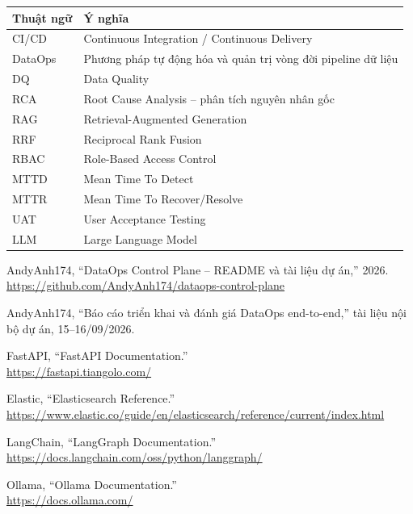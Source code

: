 \documentclass[12pt,a4paper,oneside]{report}
\begin{document}
\begin{longtable}{L{3.0cm} L{11.0cm}}
\toprule
\textbf{Thuật ngữ} & \textbf{Ý nghĩa} \\
\midrule
CI/CD & Continuous Integration / Continuous Delivery \\
DataOps & Phương pháp tự động hóa và quản trị vòng đời pipeline dữ liệu \\
DQ & Data Quality \\
RCA & Root Cause Analysis -- phân tích nguyên nhân gốc \\
RAG & Retrieval-Augmented Generation \\
RRF & Reciprocal Rank Fusion \\
RBAC & Role-Based Access Control \\
MTTD & Mean Time To Detect \\
MTTR & Mean Time To Recover/Resolve \\
UAT & User Acceptance Testing \\
LLM & Large Language Model \\
\bottomrule
\end{longtable}

\begin{thebibliography}{9}
AndyAnh174, ``DataOps Control Plane -- README và tài liệu dự án,'' 2026.\\
\url{https://github.com/AndyAnh174/dataops-control-plane}

AndyAnh174, ``Báo cáo triển khai và đánh giá DataOps end-to-end,'' tài liệu nội bộ dự án,
15--16/09/2026.

FastAPI, ``FastAPI Documentation.''\\
\url{https://fastapi.tiangolo.com/}

Elastic, ``Elasticsearch Reference.''\\
\url{https://www.elastic.co/guide/en/elasticsearch/reference/current/index.html}

LangChain, ``LangGraph Documentation.''\\
\url{https://docs.langchain.com/oss/python/langgraph/}

Ollama, ``Ollama Documentation.''\\
\url{https://docs.ollama.com/}
\end{thebibliography}
\end{document}
